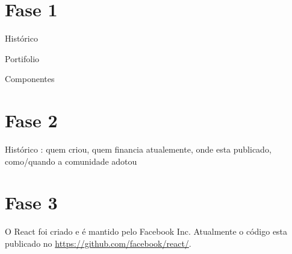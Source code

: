 \documentclass[
	12pt,				%
	openright,			%
	twoside,			%
	a4paper,			%
	english,			%
	french,				%
	spanish,			%
	brazil				%
  ]{abntex2}
\begin{document}
  
\chapter{Fase 1}
  
  Histórico

  Portifolio

  Componentes

\chapter{Fase 2}

  Histórico : quem criou, quem financia atualemente, onde esta publicado, como/quando a comunidade adotou

\chapter{Fase 3}

  O React foi criado e é mantido pelo Facebook Inc. Atualmente o código esta publicado no \url{https://github.com/facebook/react/}. 
\end{document}

